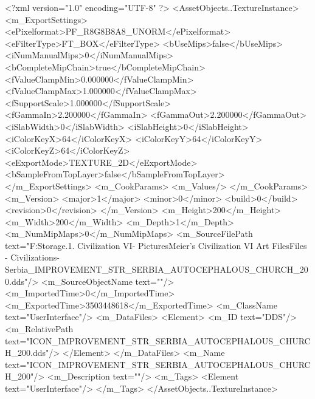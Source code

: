 <?xml version="1.0" encoding="UTF-8" ?>
<AssetObjects..TextureInstance>
	<m_ExportSettings>
		<ePixelformat>PF_R8G8B8A8_UNORM</ePixelformat>
		<eFilterType>FT_BOX</eFilterType>
		<bUseMips>false</bUseMips>
		<iNumManualMips>0</iNumManualMips>
		<bCompleteMipChain>true</bCompleteMipChain>
		<fValueClampMin>0.000000</fValueClampMin>
		<fValueClampMax>1.000000</fValueClampMax>
		<fSupportScale>1.000000</fSupportScale>
		<fGammaIn>2.200000</fGammaIn>
		<fGammaOut>2.200000</fGammaOut>
		<iSlabWidth>0</iSlabWidth>
		<iSlabHeight>0</iSlabHeight>
		<iColorKeyX>64</iColorKeyX>
		<iColorKeyY>64</iColorKeyY>
		<iColorKeyZ>64</iColorKeyZ>
		<eExportMode>TEXTURE_2D</eExportMode>
		<bSampleFromTopLayer>false</bSampleFromTopLayer>
	</m_ExportSettings>
	<m_CookParams>
		<m_Values/>
	</m_CookParams>
	<m_Version>
		<major>1</major>
		<minor>0</minor>
		<build>0</build>
		<revision>0</revision>
	</m_Version>
	<m_Height>200</m_Height>
	<m_Width>200</m_Width>
	<m_Depth>1</m_Depth>
	<m_NumMipMaps>0</m_NumMipMaps>
	<m_SourceFilePath text="F:\Mod Storage\2.1. Civilization VI\Mods\Archive - Pictures\Sid Meier's Civilization VI Art Files\Art Files - Civilizations\Civilization - Serbia\ICON_IMPROVEMENT_STR_SERBIA_AUTOCEPHALOUS_CHURCH_200.dds"/>
	<m_SourceObjectName text=""/>
	<m_ImportedTime>0</m_ImportedTime>
	<m_ExportedTime>3503448618</m_ExportedTime>
	<m_ClassName text="UserInterface"/>
	<m_DataFiles>
		<Element>
			<m_ID text="DDS"/>
			<m_RelativePath text="ICON_IMPROVEMENT_STR_SERBIA_AUTOCEPHALOUS_CHURCH_200.dds"/>
		</Element>
	</m_DataFiles>
	<m_Name text="ICON_IMPROVEMENT_STR_SERBIA_AUTOCEPHALOUS_CHURCH_200"/>
	<m_Description text=""/>
	<m_Tags>
		<Element text="UserInterface"/>
	</m_Tags>
</AssetObjects..TextureInstance>


